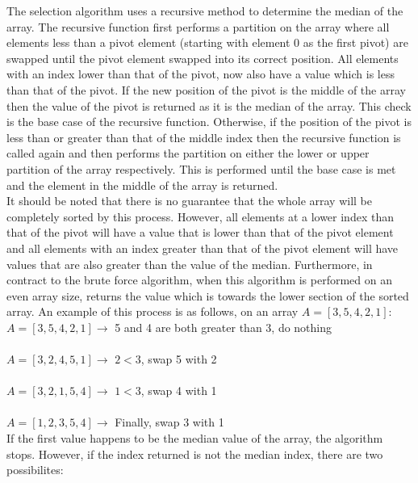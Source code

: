 \documentclass{article}
\begin{document}
        The selection algorithm uses a recursive method to determine the median of the array.  The recursive function first performs a partition on the array where all elements less than a pivot element (starting with element 0 as the first pivot) are swapped until the pivot element swapped into its correct position. All elements with an index lower than that of the pivot, now also have a value which is less than that of the pivot. If the new position of the pivot is the middle of the array then the value of the pivot is returned as it is the median of the array. This check is the base case of the recursive function.
        Otherwise, if the position of the pivot is less than or greater than that of the middle index then the recursive function is called again and then performs the partition on either the lower or upper partition of the array respectively. This is performed until the base case is met and the element in the middle of the array is returned.\\
        It should be noted that there is no guarantee that the whole array will be completely sorted by this process. However, all elements at a lower index than that of the pivot will have a value that is lower than that of the pivot element and all elements with an index greater than that of the pivot element will have values that are also greater than the value of the median.
        Furthermore, in contract to the brute force algorithm, when this algorithm is performed on an even array size, returns the value which is towards the lower section of the sorted array.
        An example of this process is as follows, on an array $A = [3, 5, 4, 2, 1]$:\\

        \noindent$A = [3, 5, 4, 2, 1] \rightarrow$  5 and 4 are both greater than 3, do nothing\\\\
        $A = [3, 2, 4, 5, 1] \rightarrow$  $2 < 3$, swap 5 with 2\\\\
        $A = [3, 2, 1, 5, 4] \rightarrow$  $1 < 3$, swap 4 with 1\\\\
        $A = [1, 2, 3, 5, 4] \rightarrow$  Finally, swap 3 with 1\\

        If the first value happens to be the median value of the array, the algorithm stops. However, if the index returned is not the median index, there are two possibilites:
\end{document}

